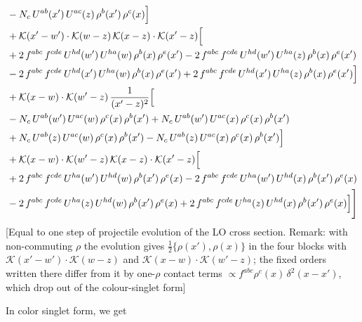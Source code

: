 \documentclass[9pt]{article}
\numberwithin{equation}{section}
\begin{document}
\begin{align}
& -N_{c}\,U^{ab}(x')\,U^{ac}(z)\,\rho^{b}(x')\,\rho^{c}(x)\Big]\notag\\
& +\mathcal{K}(x'-w')\cdot\mathcal{K}(w-z)\,\mathcal{K}(x-z)\cdot\mathcal{K}(x'-z)\Big[\notag\\
& +2\,f^{abc}\,f^{cde}\,U^{hd}(w')\,U^{ha}(w)\,\rho^{b}(x)\,\rho^{e}(x') -2\,f^{abc}\,f^{cde}\,U^{hd}(w')\,U^{ha}(z)\,\rho^{b}(x)\,\rho^{e}(x')\notag\\
& -2\,f^{abc}\,f^{cde}\,U^{hd}(x')\,U^{ha}(w)\,\rho^{b}(x)\,\rho^{e}(x') +2\,f^{abc}\,f^{cde}\,U^{hd}(x')\,U^{ha}(z)\,\rho^{b}(x)\,\rho^{e}(x')\Big]\notag\\
& +\mathcal{K}(x-w)\cdot\mathcal{K}(w'-z)\,\frac{1}{(x'-z)^{2}}\Big[\notag\\
& -N_{c}\,U^{ab}(w')\,U^{ac}(w)\,\rho^{c}(x)\,\rho^{b}(x') +N_{c}\,U^{ab}(w')\,U^{ac}(x)\,\rho^{c}(x)\,\rho^{b}(x')\notag\\
& +N_{c}\,U^{ab}(z)\,U^{ac}(w)\,\rho^{c}(x)\,\rho^{b}(x') -N_{c}\,U^{ab}(z)\,U^{ac}(x)\,\rho^{c}(x)\,\rho^{b}(x')\Big]\notag\\
& +\mathcal{K}(x-w)\cdot\mathcal{K}(w'-z)\,\mathcal{K}(x-z)\cdot\mathcal{K}(x'-z)\Big[\notag\\
& +2\,f^{abc}\,f^{cde}\,U^{ha}(w')\,U^{hd}(w)\,\rho^{b}(x')\,\rho^{e}(x) -2\,f^{abc}\,f^{cde}\,U^{ha}(w')\,U^{hd}(x)\,\rho^{b}(x')\,\rho^{e}(x)\notag\\
& -2\,f^{abc}\,f^{cde}\,U^{ha}(z)\,U^{hd}(w)\,\rho^{b}(x')\,\rho^{e}(x) +2\,f^{abc}\,f^{cde}\,U^{ha}(z)\,U^{hd}(x)\,\rho^{b}(x')\,\rho^{e}(x)\Big]\Bigg]
\end{align} {\color{red}[Equal to one step of projectile evolution of the LO cross section. Remark: with non-commuting $\rho$ the evolution gives $\tfrac12\{\rho(x'),\rho(x)\}$ in the four blocks with $\mathcal{K}(x'-w')\cdot\mathcal{K}(w-z)$ and $\mathcal{K}(x-w)\cdot\mathcal{K}(w'-z)$; the fixed orders written there differ from it by one-$\rho$ contact terms $\propto f^{abc}\rho^{c}(x)\,\delta^{2}(x-x')$, which drop out of the colour-singlet form]}\par\noindent
In color singlet form, we get
\end{document}
